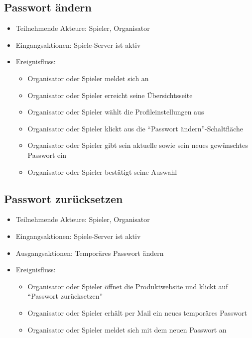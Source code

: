 \documentclass[a4paper]{scrreprt}
\begin{document}
    \subsection{Passwort ändern}
    \begin{itemize}
    \item Teilnehmende Akteure: \Gls{Spieler}, \Gls{Organisator}
    \item Eingangsaktionen: Spiele-Server ist aktiv
    \item Ereignisfluss:
        \begin{itemize}
            \item \Gls{Organisator} oder \Gls{Spieler} meldet sich an
            \item \Gls{Organisator} oder \Gls{Spieler} erreicht seine Übersichtsseite
            \item \Gls{Organisator} oder \Gls{Spieler} wählt die Profileinstellungen aus
            \item \Gls{Organisator} oder \Gls{Spieler} klickt aus die \enquote{Passwort ändern}-Schaltfläche
            \item \Gls{Organisator} oder \Gls{Spieler} gibt sein aktuelle sowie sein neues gewünschtes Passwort ein
            \item \Gls{Organisator} oder \Gls{Spieler} bestätigt seine Auswahl
        \end{itemize}
    \end{itemize}

    \subsection{Passwort zurücksetzen}
    \begin{itemize}
        \item Teilnehmende Akteure: \Gls{Spieler}, \Gls{Organisator}
        \item Eingangsaktionen: Spiele-Server ist aktiv
        \item Ausgangsaktionen: Temporäres Passwort ändern
        \item Ereignisfluss:
        \begin{itemize}
            \item \Gls{Organisator} oder \Gls{Spieler} öffnet die Produktwebsite und klickt auf \enquote{Passwort zurücksetzen}
            \item \Gls{Organisator} oder \Gls{Spieler} erhält per Mail ein neues temporäres Passwort
            \item \Gls{Organisator} oder \Gls{Spieler} meldet sich mit dem neuen Passwort an
        \end{itemize}
    \end{itemize}
\end{document}
